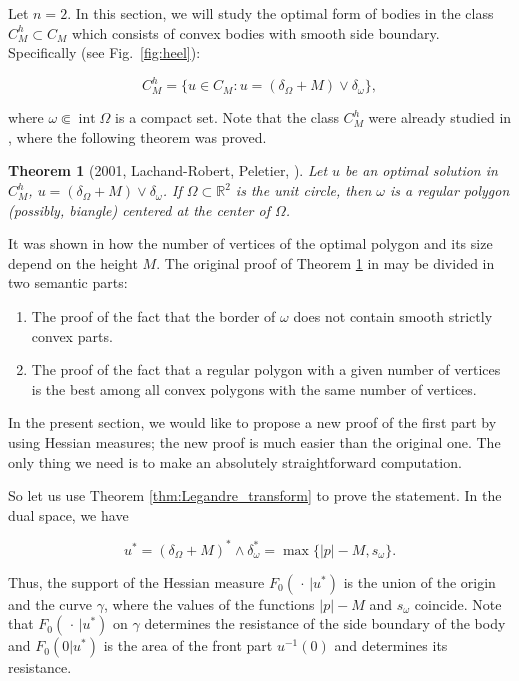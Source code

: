 \documentclass[14pt]{extarticle}
\newcommand{\R}{\mathbb{R}}
\DeclareMathOperator{\Int}{\mathrm{int}}
\newtheorem{thm}{Theorem}
\theoremstyle{remark}
\theoremstyle{definition}
\begin{document}
Let $n=2$. In this section, we will study the optimal form of bodies in the class $C_M^h\subset C_M$ which consists of convex bodies with smooth side boundary. Specifically  (see Fig.~\ref{fig:heel}):

\[
	C_M^h=\{u\in C_M: u=(\delta_\Omega+M)\vee \delta_\omega\},
\]

\noindent where $\omega\Subset \Int\Omega$ is a compact set. Note that the class $C_M^h$ were already studied in \cite{LachandPolygon}, where the following theorem was proved.

\begin{thm}[2001, Lachand-Robert, Peletier, \cite{LachandPolygon}]
\label{thm:heel}
	Let $u$ be an optimal solution in $C_M^h$, $u=(\delta_\Omega+M)\vee\delta_\omega$. If $\Omega\subset \R^2$ is the unit circle, then $\omega$ is a regular polygon (possibly, biangle) centered at the center of $\Omega$.
\end{thm}

It was shown in \cite{LachandPolygon} how the number of vertices of the optimal polygon and its size depend on the height $M$. The original proof of Theorem \ref{thm:heel} in \cite{LachandPolygon} may be divided in two semantic parts:

\begin{enumerate}
	\item The proof of the fact that the border of $\omega$ does not contain smooth strictly convex parts.
	\item The proof of the fact that a regular polygon with a given number of vertices is the best among all convex polygons with the same number of vertices.
\end{enumerate}

In the present section, we would like to propose a new proof of the first part by using Hessian measures; the new proof is much easier than the original one. The only thing we need is to make an absolutely straightforward computation.

So let us use Theorem \ref{thm:Legandre_transform} to prove the statement. In the dual space, we have

\[
	u^* = (\delta_\Omega+M)^* \wedge \delta_\omega^* = \max\{|p|-M,s_\omega\}.
\]

\noindent Thus, the support of the Hessian measure $F_0(\,\cdot\,|u^*)$ is the union of the origin and the curve $\gamma$, where the values of the functions $|p|-M$ and $s_\omega$ coincide. Note that $F_0(\,\cdot\,|u^*)$ on $\gamma$ determines the resistance of the side boundary of the body and $F_0(0|u^*)$ is the area of the front part $u^{-1}(0)$ and determines its resistance.
\end{document}
